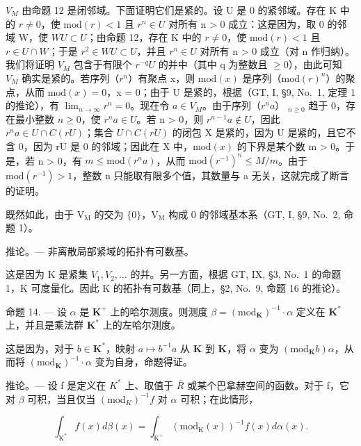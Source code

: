 \(V_{M}\) 由命题 12 是闭邻域。下面证明它们是紧的。设 U 是 0 的紧邻域。存在 K 中的 \(r \neq 0\)，使 \(\text{mod}(r) < 1\) 且 \(r^{n} \in U\) 对所有 n \textgreater{} 0 成立：这是因为，取 0 的邻域 W，使 \(WU \subset U\)；由命题 12，存在 K 中的 \(r \neq 0\)，使 \(\text{mod}(r) < 1\) 且 \(r \in U \cap W\)；于是 \(r^{2} \in WU \subset U\)，并且 \(r^{n} \in U\) 对所有 n \textgreater{} 0 成立（对 n 作归纳）。我们将证明 \(V_{M}\) 包含于有限个 \(r^{-q}U\) 的并中（其中 q 为整数且 \(\geqslant 0\)），由此可知 \(V_{M}\) 确实是紧的。若序列（\(r^{n}\)）有聚点 x，则 \(\text{mod}(x)\) 是序列（\(\text{mod}(r)^{n}\)）的聚点，从而 \(\text{mod}(x) = 0\)，x = 0；由于 U 是紧的，根据（GT, I, §9, No.~1, 定理 1 的推论），有 \(\lim_{n \to \infty} r^{n} = 0\)。现在令 \(a \in V_{M}\)。由于序列（\(r^{n}a\)） \(_{n \geqslant 0}\) 趋于 0，存在最小整数 \(n \geqslant 0\)，使 \(r^{n}a \in U\)。若 n \textgreater{} 0，则 \(r^{n-1}a \notin U\)，因此 \(r^{n}a \in U \cap C(rU)\)；集合 \(U \cap C(rU)\) 的闭包 X 是紧的，因为 U 是紧的，且它不含 0，因为 rU 是 0 的邻域；因此在 X 中，\(\text{mod}(x)\) 的下界是某个数 m \textgreater{} 0。于是，若 n \textgreater{} 0，有 \(m \leqslant \text{mod}(r^{n}a)\)，从而 \(\text{mod}(r^{-1})^{n} \leqslant M/m\)。由于 \(\text{mod}(r^{-1}) > 1\)，整数 n 只能取有限多个值，其数量与 a 无关，这就完成了断言的证明。

既然如此，由于 \(\mathrm{V_M}\) 的交为 \(\{0\}\)，\(\mathrm{V_M}\) 构成 0 的邻域基本系（GT, I, §9, No.~2, 命题 1）。

推论。--- 非离散局部紧域的拓扑有可数基。

这是因为 K 是紧集 \(V_{1}, V_{2}, \ldots\) 的并。另一方面，根据 GT, IX, §3, No.~1 的命题 1，K 可度量化。因此 K 的拓扑有可数基（同上，§2, No.~9, 命题 16 的推论）。

命题 14. --- 设 \(\alpha\) 是 \(\mathbf{K}^{+}\) 上的哈尔测度。则测度 \(\beta = (\mathrm{mod}_{\mathbf{K}})^{-1} \cdot \alpha\) 定义在 \(\mathbf{K}^{*}\) 上，并且是乘法群 \(\mathbf{K}^{*}\) 上的左哈尔测度。

这是因为，对于 \(b \in \mathbf{K}^*\)，映射 \(a \mapsto b^{-1}a\) 从 \(\mathbf{K}\) 到 \(\mathbf{K}\)，将 \(\alpha\) 变为 \((\mathrm{mod}_{\mathbf{K}}b)\alpha\)，从而将 \((\mathrm{mod}_{\mathbf{K}})^{-1} \cdot \alpha\) 变为自身，命题得证。

推论。--- 设 f 是定义在 \(K^{*}\) 上、取值于 \(\overline{R}\) 或某个巴拿赫空间的函数。对于 f，它对 \(\beta\) 可积，当且仅当 \((\mathrm{mod}_K)^{-1}f\) 对 \(\alpha\) 可积；在此情形，

\[
\int_ {\mathrm{K} ^ {*}} f (x) d \beta (x) = \int_ {\mathrm{K} ^ {+}} \left(\mathrm{mod} _ {\mathrm{K}} (x)\right) ^ {- 1} f (x) d \alpha (x).
\]

